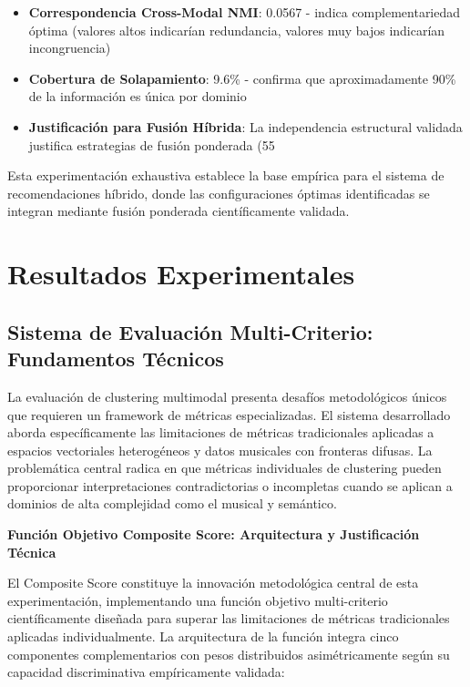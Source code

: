 \documentclass[12pt,a4paper]{report}
\begin{document}
\begin{itemize}
\item \textbf{Correspondencia Cross-Modal NMI}: 0.0567 - indica complementariedad óptima (valores altos indicarían redundancia, valores muy bajos indicarían incongruencia)
\item \textbf{Cobertura de Solapamiento}: 9.6\% - confirma que aproximadamente 90\% de la información es única por dominio
\item \textbf{Justificación para Fusión Híbrida}: La independencia estructural validada justifica estrategias de fusión ponderada (55%
\end{itemize}

Esta experimentación exhaustiva establece la base empírica para el sistema de recomendaciones híbrido, donde las configuraciones óptimas identificadas se integran mediante fusión ponderada científicamente validada.

\section{Resultados Experimentales}

\subsection{Sistema de Evaluación Multi-Criterio: Fundamentos Técnicos}

La evaluación de clustering multimodal presenta desafíos metodológicos únicos que requieren un framework de métricas especializadas. El sistema desarrollado aborda específicamente las limitaciones de métricas tradicionales aplicadas a espacios vectoriales heterogéneos y datos musicales con fronteras difusas. La problemática central radica en que métricas individuales de clustering pueden proporcionar interpretaciones contradictorias o incompletas cuando se aplican a dominios de alta complejidad como el musical y semántico.

\textbf{Función Objetivo Composite Score: Arquitectura y Justificación Técnica}

El Composite Score constituye la innovación metodológica central de esta experimentación, implementando una función objetivo multi-criterio científicamente diseñada para superar las limitaciones de métricas tradicionales aplicadas individualmente. La arquitectura de la función integra cinco componentes complementarios con pesos distribuidos asimétricamente según su capacidad discriminativa empíricamente validada:
\end{document}
